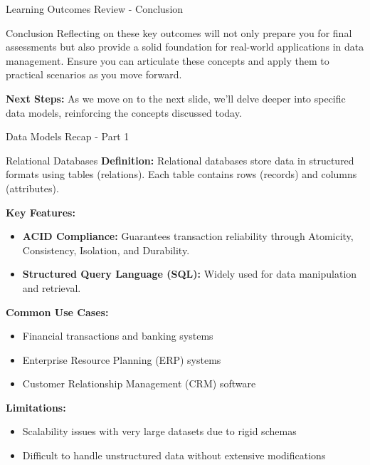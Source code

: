 \documentclass[aspectratio=169]{beamer}
\begin{document}
\begin{frame}[fragile]{Learning Outcomes Review - Conclusion}
    \begin{block}{Conclusion}
        Reflecting on these key outcomes will not only prepare you for final assessments but also provide a solid foundation for real-world applications in data management. Ensure you can articulate these concepts and apply them to practical scenarios as you move forward.
    \end{block}

    \textbf{Next Steps:} As we move on to the next slide, we'll delve deeper into specific data models, reinforcing the concepts discussed today.
\end{frame}

\begin{frame}[fragile]{Data Models Recap - Part 1}
  \begin{block}{Relational Databases}
    \textbf{Definition:}  
    Relational databases store data in structured formats using tables (relations). Each table contains rows (records) and columns (attributes).

    \textbf{Key Features:}
    \begin{itemize}
      \item \textbf{ACID Compliance:} Guarantees transaction reliability through Atomicity, Consistency, Isolation, and Durability.
      \item \textbf{Structured Query Language (SQL):} Widely used for data manipulation and retrieval.
    \end{itemize}

    \textbf{Common Use Cases:}
    \begin{itemize}
      \item Financial transactions and banking systems
      \item Enterprise Resource Planning (ERP) systems
      \item Customer Relationship Management (CRM) software
    \end{itemize}

    \textbf{Limitations:}
    \begin{itemize}
      \item Scalability issues with very large datasets due to rigid schemas
      \item Difficult to handle unstructured data without extensive modifications
    \end{itemize}
  \end{block}
\end{frame}
\end{document}
